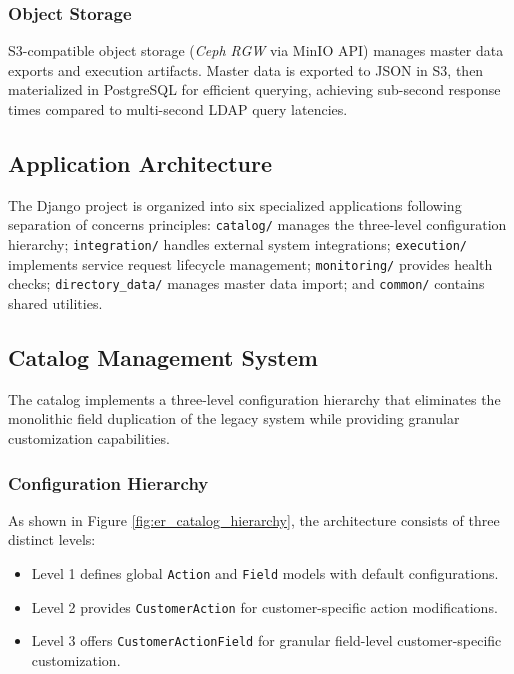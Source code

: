 \subsubsection{Object Storage}

S3-compatible object storage (\textit{Ceph RGW} via MinIO API) manages master data exports and execution artifacts. Master data is exported to JSON in S3, then materialized in PostgreSQL for efficient querying, achieving sub-second response times compared to multi-second LDAP query latencies.

\subsection{Application Architecture}

The Django project is organized into six specialized applications following separation of concerns principles: \texttt{catalog/} manages the three-level configuration hierarchy; \texttt{integration/} handles external system integrations; \texttt{execution/} implements service request lifecycle management; \texttt{monitoring/} provides health checks; \texttt{directory\_data/} manages master data import; and \texttt{common/} contains shared utilities.

\subsection{Catalog Management System}

The catalog implements a three-level configuration hierarchy that eliminates the monolithic field duplication of the legacy system while providing granular customization capabilities.

\subsubsection{Configuration Hierarchy}

As shown in Figure \ref{fig:er_catalog_hierarchy}, the architecture consists of three distinct levels: 
\begin{itemize}
    \item Level 1 defines global \texttt{Action} and \texttt{Field} models with default configurations.
    \item Level 2 provides \texttt{CustomerAction} for customer-specific action modifications.
    \item Level 3 offers \texttt{CustomerActionField} for granular field-level customer-specific customization.
\end{itemize}


